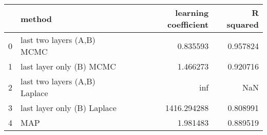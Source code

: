 \begin{tabular}{llrr}
\toprule
{} &                         method &  learning coefficient &  R squared \\
\midrule
0 &     last two layers (A,B) MCMC &              0.835593 &   0.957824 \\
1 &       last layer only (B) MCMC &              1.466273 &   0.920716 \\
2 &  last two layers (A,B) Laplace &                   inf &        NaN \\
3 &    last layer only (B) Laplace &           1416.294288 &   0.808991 \\
4 &                            MAP &              1.981483 &   0.889519 \\
\bottomrule
\end{tabular}
